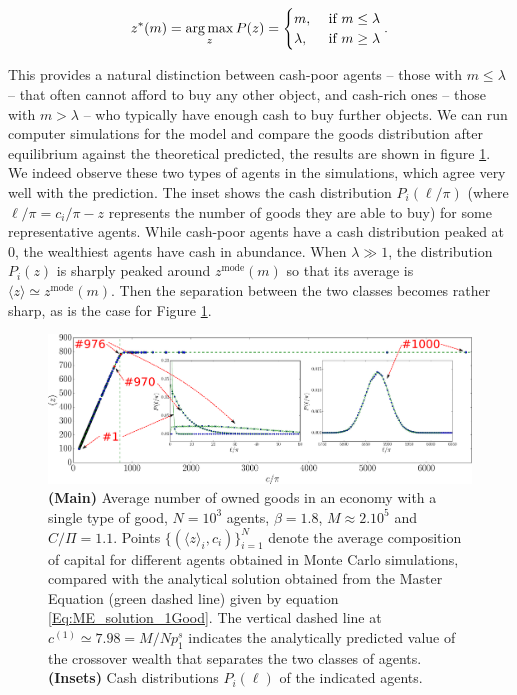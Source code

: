 \begin{equation}
z^\ast(m)  = \operatorname*{arg\,max}_z  P(z)=
\begin{cases}
    m, & \text{ if } m \leq \lambda \\
    \lambda, & \text{ if } m \geq \lambda
  \end{cases}.
  \label{Eq:cases_ztyp}
\end{equation}

This provides a natural distinction between cash-poor agents -- those with $m \leq \lambda$ --  that often cannot afford to buy any other object, and cash-rich ones -- those with $m> \lambda$ --  who typically have enough cash to buy further objects. We can run computer simulations for the model and compare the goods distribution after equilibrium against the theoretical predicted, the results are shown in figure \ref{Fig:Picturesque_RichPoor_transition_beta}. We indeed observe these two types of agents in the simulations, which agree very well with the prediction. The inset shows the cash distribution $P_i(\ell/\pi)$ (where $\ell/\pi = c_i/\pi - z$ represents the number of goods they are able to buy) for some representative agents. While cash-poor agents have a cash distribution peaked at $0$, the wealthiest agents have cash in abundance. When $\lambda\gg 1$, the distribution $P_i(z)$ is sharply peaked around $z^{\text{mode}}(m)$ so that its average is $\langle z\rangle\simeq z^{\text{mode}}(m)$. Then the separation between the two classes becomes rather sharp, as is the case for Figure \ref{Fig:Picturesque_RichPoor_transition_beta}.

\begin{figure}%
\centering
\includegraphics[width=\textwidth]{figs_ineq/fig3_ownership_average_beta=1p80_e=1p10-byHand.pdf}
\caption{\textbf{(Main)} Average number of owned goods in an economy with a single type of good, $N=10^3$ agents, $\beta=1.8$, $M\approx 2 . 10^5$ and $C/\Pi=1.1$. Points $\{(\langle z \rangle_i,c_i)\}_{i=1}^{N}$ denote the average composition of capital for different agents obtained in Monte Carlo simulations, compared with the analytical solution obtained from the Master Equation (green dashed line) given by equation \eqref{Eq:ME_solution_1Good}.
The vertical dashed line at $c^{(1)}\simeq 7.98=M/N p^s_1$ indicates the analytically predicted value of the crossover wealth that separates the two classes of agents. \textbf{(Insets)} Cash distributions $P_i(\ell)$ of the indicated agents. 
}
\label{Fig:Picturesque_RichPoor_transition_beta}
\end{figure}

